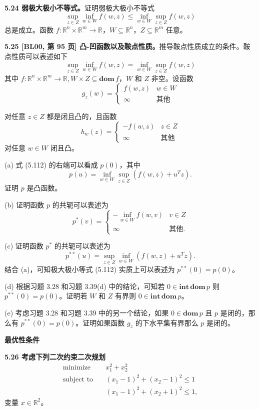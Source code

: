 \documentclass[UTF8,12pt,a4paper,fontset=fandol]{ctexart}
\begin{document}
\noindent\textbf{5.24 弱极大极小不等式。}\quad 证明弱极大极小不等式
\[
\sup_{z\in Z}\inf_{w\in W}f(w,z)\leq \inf_{w\in W}\sup_{z\in Z}f(w,z)
\]
总是成立。函数 $f:\mathbb{R}^n\times\mathbb{R}^m\to\mathbb{R}$，$W\subseteq\mathbb{R}^n$，$Z\subseteq\mathbb{R}^m$ 任意。

\noindent\textbf{5.25 [BL00, 第 95 页] 凸-凹函数以及鞍点性质。}\quad 推导鞍点性质成立的条件。鞍点性质可以表述如下
\begin{equation}
\sup_{z\in Z}\inf_{w\in W}f(w,z)=\inf_{w\in W}\sup_{z\in Z}f(w,z)
\tag{5.112}
\end{equation}
其中 $f:\mathbb{R}^n\times\mathbb{R}^m\to\mathbb{R}, W\times Z\subseteq\mathbf{dom}\,f$，$W$ 和 $Z$ 非空。设函数
\[
g_z(w)=
\begin{cases}
f(w,z) & w\in W\\
\infty & \text{其他}
\end{cases}
\]

对任意 $z\in Z$ 都是闭且凸的，且函数
\[
h_w(z)=
\begin{cases}
-f(w,z) & z\in Z\\
\infty & \text{其他}
\end{cases}
\]
对任意 $w\in W$ 闭且凸。

(a) 式 (5.112) 的右端可以看成 $p(0)$，其中
\[
p(u)=\inf_{w\in W}\sup_{z\in Z}(f(w,z)+u^Tz).
\]
证明 $p$ 是凸函数。

(b) 证明函数 $p$ 的共轭可以表述为
\[
p^\ast(v)=
\begin{cases}
-\inf_{w\in W}f(w,v) & v\in Z\\
\infty & \text{其他}.
\end{cases}
\]

(c) 证明函数 $p^\ast$ 的共轭可以表述为
\[
p^{\ast\ast}(u)=\sup_{z\in Z}\inf_{w\in W}(f(w,z)+u^Tz).
\]
结合 (a)，可知极大极小等式 (5.112) 实质上可以表述为 $p^{\ast\ast}(0)=p(0)$。

(d) 根据习题 3.28 和习题 3.39(d) 中的结论，可知若 $0\in\mathbf{int}\,\mathbf{dom}\,p$ 则 $p^{\ast\ast}(0)=p(0)$。证明若 $W$ 和 $Z$ 有界则 $0\in\mathbf{int}\,\mathbf{dom}\,p$。

(e) 考虑习题 3.28 和习题 3.39 中的另一个结论，如果 $0\in\mathbf{dom}\,p$ 且 $p$ 是闭的，那么有 $p^{\ast\ast}(0)=p(0)$。证明如果函数 $g_z$ 的下水平集有界那么 $p$ 是闭的。

\noindent\textbf{最优性条件}

\noindent\textbf{5.26 考虑下列二次约束二次规划}
\[
\begin{aligned}
\text{minimize}\quad & x_1^2+x_2^2\\
\text{subject to}\quad & (x_1-1)^2+(x_2-1)^2\leq 1\\
& (x_1-1)^2+(x_2+1)^2\leq 1,
\end{aligned}
\]
变量 $x\in\mathbb{R}^2$。
\end{document}
